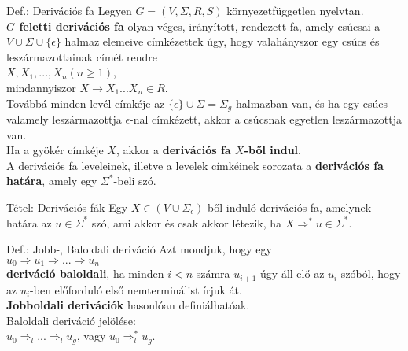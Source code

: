 \documentclass{beamer}
\begin{document}
\begin{frame}
\begin{block}{Def.: Derivációs fa}
Legyen $G = (V, {\Sigma}, R, S)$ környezetfüggetlen nyelvtan.\\
\textbf{$G$ feletti derivációs fa} olyan véges, irányított, rendezett fa, amely csúcsai a $V \cup {\Sigma} \cup \{{\epsilon}\}$ halmaz elemeive címkézettek úgy, hogy valahányszor egy csúcs és leszármazottainak címét rendre\\
\medskip
$X, X_1, ..., X_n (n \geq 1)$,\\
mindannyiszor $X \rightarrow X_1...X_n \in R$.\\
\medskip
Továbbá minden levél címkéje az $\{{\epsilon}\} \cup {\Sigma} = {\Sigma}_g$ halmazban van, és ha egy csúcs valamely leszármazottja $\epsilon$-nal címkézett, akkor a csúcsnak egyetlen leszármazottja van.\\
\bigskip
Ha a gyökér címkéje $X$, akkor a \textbf{derivációs fa $X$-ből indul}.\\
\bigskip
A derivációs fa leveleinek, illetve a levelek címkéinek sorozata a \textbf{derivációs fa határa}, amely egy ${\Sigma}^*$-beli szó.
\end{block}
\end{frame}

\begin{frame}
\begin{block}{Tétel: Derivációs fák}
Egy $X \in (V \cup {\Sigma}_{\epsilon})$-ből induló derivációs fa, amelynek határa az $u \in {\Sigma}^*$ szó, ami akkor és csak akkor létezik, ha $X {\Rightarrow}^* u \in {\Sigma}^*$.
\end{block}

\begin{block}{Def.: Jobb-, Baloldali deriváció}
Azt mondjuk, hogy egy\\
\bigskip
$u_0 \Rightarrow u_1 \Rightarrow ... \Rightarrow u_n$\\
\bigskip
\textbf{deriváció baloldali}, ha minden $i < n$ számra $u_{i + 1}$ úgy áll elő az $u_i$ szóból, hogy az $u_i$-ben előforduló első nemterminálist írjuk át.\\
\bigskip
\textbf{Jobboldali derivációk} hasonlóan definiálhatóak.\\
\bigskip
Baloldali deriváció jelölése:\\
\bigskip
$u_0 {\Rightarrow}_l ... {\Rightarrow}_l u_g$, vagy $u_0 {\Rightarrow}^*_l u_g$.
\end{block}
\end{frame}
\end{document}
